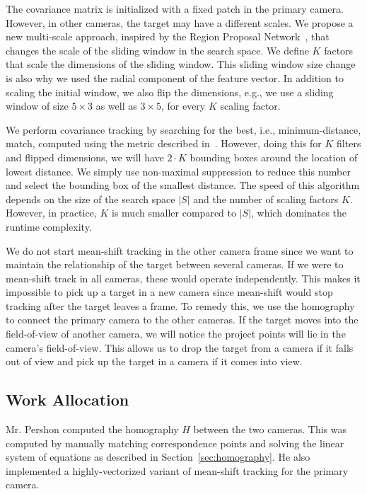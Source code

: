 \documentclass{article}
\begin{document}
The covariance matrix is initialized with a fixed patch in the primary camera. However, in other cameras, the target may have a different scales. We propose a new multi-scale approach, inspired by the Region Proposal Network~\cite{ren2015faster}, that changes the scale of the sliding window in the search space. We define $K$ factors that scale the dimensions of the sliding window. This sliding window size change is also why we used the radial component of the feature vector. In addition to scaling the initial window, we also flip the dimensions, e.g., we use a sliding window of size $5\times 3$ as well as $3\times 5$, for every $K$ scaling factor. 

We perform covariance tracking by searching for the best, i.e., minimum-distance, match, computed using the metric described in~\cite{forstner2003metric}. However, doing this for $K$ filters and flipped dimensions, we will have $2\cdot K$ bounding boxes around the location of lowest distance. We simply use non-maximal suppression to reduce this number and select the bounding box of the smallest distance. The speed of this algorithm depends on the size of the search space $|S|$ and the number of scaling factors $K$. However, in practice, $K$ is much smaller compared to $|S|$, which dominates the runtime complexity.

We do not start mean-shift tracking in the other camera frame since we want to maintain the relationship of the target between several cameras. If we were to mean-shift track in all cameras, these would operate independently. This makes it impossible to pick up a target in a new camera since mean-shift would stop tracking after the target leaves a frame. To remedy this, we use the homography to connect the primary camera to the other cameras. If the target moves into the field-of-view of another camera, we will notice the project points will lie in the camera's field-of-view. This allows us to drop the target from a camera if it falls out of view and pick up the target in a camera if it comes into view.

\subsection{Work Allocation}
Mr. Pershon computed the homography $H$ between the two cameras. This was computed by manually matching correspondence points and solving the linear system of equations as described in Section~\ref{sec:homography}. He also implemented a highly-vectorized variant of mean-shift tracking for the primary camera.
\end{document}

